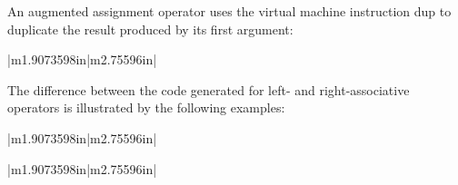 An augmented assignment operator uses the virtual machine instruction
dup to duplicate the result produced by its first argument:

\begin{center}
\tablelasttail{\hline}
\begin{xtabular}{|m{1.9073598in}|m{2.75596in}|}

\end{xtabular}
\end{center}

The difference between the code generated for left- and
right-associative operators is illustrated by the following examples:

\begin{center}
\tablelasttail{\hline}
\begin{xtabular}{|m{1.9073598in}|m{2.75596in}|}

\end{xtabular}
\end{center}

\bigskip

\begin{center}
\tablelasttail{\hline}
\begin{xtabular}{|m{1.9073598in}|m{2.75596in}|}

\end{xtabular}
\end{center}

